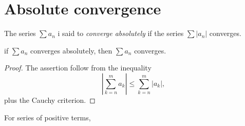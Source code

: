 \section{Absolute convergence}
The series $\sum a_n$ i said to \emph{converge absolutely} if the series $\sum |a_n|$ converges.

\begin{thm}
    \label{thm:3.45}
    if $\sum a_n$ converges absolutely,
    then $\sum a_n$ converges.    
\end{thm}

\begin{proof}
    The assertion follow from the inequality
    \begin{equation*}
        \left|\sum_{k=n}^{m}a_k\right|
        \leq \sum_{k=n}^{m} |a_k|,
    \end{equation*}
    plus the Cauchy criterion.
\end{proof}

\begin{myRemark}
    For series of positive terms, 
\end{myRemark}